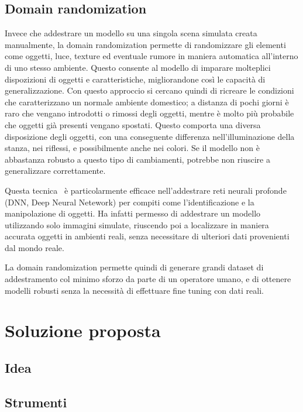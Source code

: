 \documentclass[12pt]{report}
\begin{document}
\section{Domain randomization}
\label{sec:randomization}

Invece che addestrare un modello su una singola scena simulata creata manualmente, la domain randomization permette di randomizzare gli elementi come oggetti, luce, texture ed eventuale rumore in maniera automatica all'interno di uno stesso ambiente. Questo consente al modello di imparare molteplici dispozizioni di oggetti e caratteristiche, migliorandone così le capacità di generalizzazione. Con questo approccio si cercano quindi di ricreare le condizioni che caratterizzano un normale ambiente domestico; a distanza di pochi giorni è raro che vengano introdotti o rimossi degli oggetti, mentre è molto più probabile che oggetti già presenti vengano spostati. Questo comporta una diversa disposizione degli oggetti, con una conseguente differenza nell'illuminazione della stanza, nei riflessi, e possibilmente anche nei colori. Se il modello non è abbastanza robusto a questo tipo di cambiamenti, potrebbe non riuscire a generalizzare correttamente.

Questa tecnica~\cite{8202133} è particolarmente efficace nell'addestrare reti neurali profonde (DNN, Deep Neural Netework) per compiti come l'identificazione e la manipolazione di oggetti. Ha infatti permesso di addestrare un modello utilizzando solo immagini simulate, riuscendo poi a localizzare in maniera accurata oggetti in ambienti reali, senza necessitare di ulteriori dati provenienti dal mondo reale.

La domain randomization permette quindi di generare grandi dataset di addestramento col minimo sforzo da parte di un operatore umano, e di ottenere modelli robusti senza la necessità di effettuare fine tuning con dati reali.

\chapter{Soluzione proposta}
\label{chap:soluzione}

\section{Idea}
\label{chap:idea}

\section{Strumenti}
\label{chap:strumenti}
\end{document}
